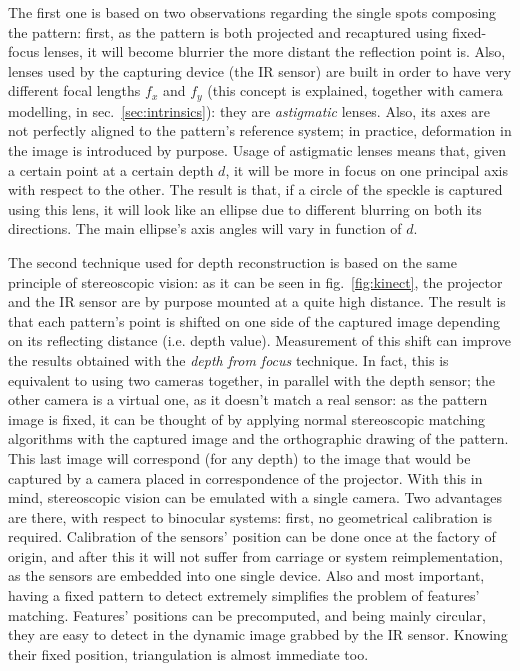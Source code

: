 The first one is based on two observations regarding the single spots
composing the pattern: first, as the pattern is both projected
and recaptured using fixed-focus lenses, it will become blurrier the more
distant the reflection point is. Also, lenses used by the capturing device (the
IR sensor) are built in order to have very different focal lengths $f_x$ and
$f_y$ (this concept is explained, together with camera modelling, in sec.~\ref{sec:intrinsics}): they are \emph{astigmatic} lenses. Also, its axes are not
perfectly aligned to the pattern's reference system; in practice, deformation in
the image is introduced by purpose. Usage of astigmatic lenses means that, given
a certain point at a certain depth $d$, it will be more in focus on one principal
axis with respect to the other. The result is that, if a circle of the speckle
is captured using this lens, it will look like an ellipse due to different
blurring on both its directions. The main ellipse's axis angles will vary in function
of $d$.

The second technique used for depth reconstruction is based on the same
principle of stereoscopic vision: as it can be seen in fig.~\ref{fig:kinect}, the projector and the IR sensor are by purpose mounted
at a quite high distance. The result is that each pattern's point is shifted on
one side of the captured image depending on its reflecting distance (i.e. depth
value). Measurement of this shift can improve the results obtained with the
\emph{depth from focus} technique. In fact, this is equivalent to using two
cameras together, in parallel with the depth sensor; the other camera is a
virtual one, as it doesn't match a real sensor: as the pattern image is fixed,
it can be thought of by applying normal stereoscopic matching algorithms with
the captured image and the orthographic drawing of the pattern. This last image
will correspond (for any depth) to the image that would be captured by a camera
placed in correspondence of the projector. With this in mind, stereoscopic
vision can be emulated with a single camera. 
Two advantages are there, with respect to binocular systems: first, no
geometrical calibration is required. Calibration of the sensors' position can be
done once at the factory of origin, and after this it will not suffer from
carriage or system reimplementation, as the sensors are embedded into one single
device. Also and most important, having a fixed pattern to detect extremely
simplifies the problem of features' matching. Features' positions can be
precomputed, and being mainly circular, they are easy to detect in the dynamic
image grabbed by the IR sensor. Knowing their fixed position, triangulation is
almost immediate too.

